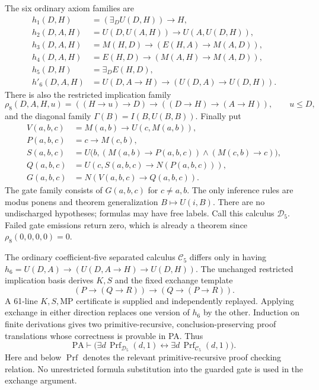 The six ordinary axiom families are
\begin{align*}
 h_1(D,H)&=(\exists_D U(D,H))\to H,\\
 h_2(D,A,H)&=U(D,U(A,H))\to U(A,U(D,H)),\\
 h_3(D,A,H)&=M(H,D)\to(E(H,A)\to M(A,D)),\\
 h_4(D,A,H)&=E(H,D)\to(M(A,H)\to M(A,D)),\\
 h_5(D,H)&=\exists_D E(H,D),\\
 h'_6(D,A,H)&=U(D,A\to H)\to(U(D,A)\to U(D,H)).
\end{align*}
There is also the restricted implication family
\[
 \rho_8(D,A,H,u)=((H\to u)\to D)\to((D\to H)\to(A\to H)),
 \qquad u\leq D,
\]
and the diagonal family $\Gamma(B)=I(B,U(B,B))$. Finally put
\begin{align*}
 V(a,b,c)&=M(a,b)\to U(c,M(a,b)),\\
 P(a,b,c)&=c\to M(c,b),\\
 S(a,b,c)&=U\bigl(b,(M(a,b)\to P(a,b,c))
                         \wedge(M(c,b)\to c)\bigr),\\
 Q(a,b,c)&=U(c,S(a,b,c)\to N(P(a,b,c))),\\
 G(a,b,c)&=N(V(a,b,c)\to Q(a,b,c)).
\end{align*}
The gate family consists of $G(a,b,c)$ for $c\ne a,b$. The only inference
rules are modus ponens and theorem generalization $B\mapsto U(i,B)$.
There are no undischarged hypotheses; formulas may have free labels.
Call this calculus $\mathcal D_5$. Failed gate emissions return zero,
which is already a theorem since $\rho_8(0,0,0,0)=0$.

The ordinary coefficient-five separated calculus $\mathcal C_5$ differs
only in having
$h_6=U(D,A)\to(U(D,A\to H)\to U(D,H))$.
The unchanged restricted implication basis derives $K,S$ and the fixed
exchange template
\[
  (P\to(Q\to R))\to(Q\to(P\to R)).
\]
A 61-line $K,S,\mathrm{MP}$ certificate is supplied and independently
replayed. Applying exchange in either direction replaces one version of
$h_6$ by the other. Induction on finite derivations gives two
primitive-recursive, conclusion-preserving proof translations whose
correctness is provable in PA. Thus
\[
 \mathrm{PA}\vdash
 \bigl(\exists d\,\operatorname{Prf}_{\mathcal D_5}(d,1)
       \leftrightarrow\exists d\,\operatorname{Prf}_{\mathcal C_5}(d,1)\bigr).
\]
Here and below $\operatorname{Prf}$ denotes the relevant primitive-recursive proof
checking relation. No unrestricted formula substitution into the guarded
gate is used in the exchange argument.

